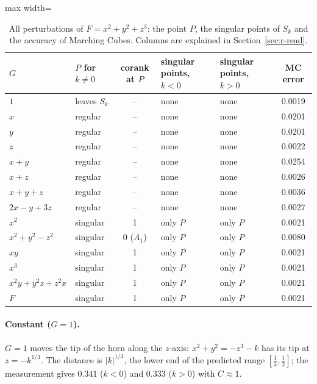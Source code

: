 \documentclass[12pt, a4paper]{article}
\theoremstyle{plain}
\theoremstyle{definition}
\theoremstyle{remark}
\theoremstyle{definition}
\begin{document}
\begin{table}[!h]
\centering
\footnotesize
\begin{adjustbox}{max width=\textwidth}
\begin{tabular}{l l c l l c}
\toprule
$G$ & $P$ for $k\neq0$ & corank at $P$ & singular points, $k<0$ & singular points, $k>0$ & MC error \\
\midrule
$1$ & leaves $S_k$ & -- & none & none & 0.0019 \\
$x$ & regular & -- & none & none & 0.0201 \\
$y$ & regular & -- & none & none & 0.0201 \\
$z$ & regular & -- & none & none & 0.0022 \\
$x+y$ & regular & -- & none & none & 0.0254 \\
$x+z$ & regular & -- & none & none & 0.0026 \\
$x+y+z$ & regular & -- & none & none & 0.0036 \\
$2x-y+3z$ & regular & -- & none & none & 0.0027 \\
$x^2$ & singular & 1 & only $P$ & only $P$ & 0.0021 \\
$x^2+y^2-z^2$ & singular & 0 ($A_1$) & only $P$ & only $P$ & 0.0080 \\
$xy$ & singular & 1 & only $P$ & only $P$ & 0.0021 \\
$x^3$ & singular & 1 & only $P$ & only $P$ & 0.0021 \\
$x^2y+y^2z+z^2x$ & singular & 1 & only $P$ & only $P$ & 0.0021 \\
$F$ & singular & 1 & only $P$ & only $P$ & 0.0021 \\
\bottomrule
\end{tabular}
\end{adjustbox}
\caption[Singular points for $x^2+y^2+z^3$]{All perturbations of $F=x^2+y^2+z^3$: the point $P$, the singular points of $S_k$ and the accuracy of Marching Cubes. Columns are explained in Section~\ref{sec:r-read}.}
\label{tab:r-A2a-points}
\end{table}
\paragraph{Constant ($G=1$).} $G=1$ moves the tip of the horn along the $z$-axis:
$x^2+y^2=-z^3-k$ has its tip at $z=-k^{1/3}$. The distance is $|k|^{1/3}$, the lower
end of the predicted range $[\tfrac13,\tfrac12]$; the measurement gives $0.341$
($k<0$) and $0.333$ ($k>0$) with $C\approx1$.
\end{document}
